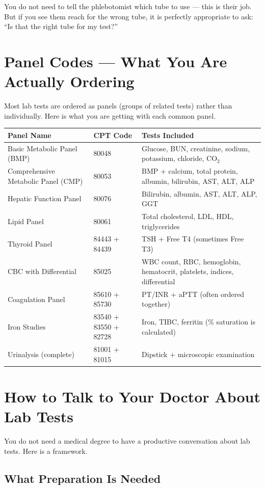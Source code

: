 You do not need to tell the phlebotomist which tube to use --- this is their job. But if you see them reach for the wrong tube, it is perfectly appropriate to ask: ``Is that the right tube for my test?''

\clearpage
\section{Panel Codes --- What You Are Actually Ordering}

Most lab tests are ordered as panels (groups of related tests) rather than individually. Here is what you are getting with each common panel.

\begin{longtable}{@{}p{4.0cm}p{3.0cm}p{6.0cm}@{}}
\toprule
\textbf{Panel Name} & \textbf{CPT Code} & \textbf{Tests Included} \\
\midrule
Basic Metabolic Panel (BMP) & 80048 & Glucose, BUN, creatinine, sodium, potassium, chloride, CO$_2$ \\
Comprehensive Metabolic Panel (CMP) & 80053 & BMP + calcium, total protein, albumin, bilirubin, AST, ALT, ALP \\
Hepatic Function Panel & 80076 & Bilirubin, albumin, AST, ALT, ALP, GGT \\
Lipid Panel & 80061 & Total cholesterol, LDL, HDL, triglycerides \\
Thyroid Panel & 84443 + 84439 & TSH + Free T4 (sometimes Free T3) \\
CBC with Differential & 85025 & WBC count, RBC, hemoglobin, hematocrit, platelets, indices, differential \\
Coagulation Panel & 85610 + 85730 & PT/INR + aPTT (often ordered together) \\
Iron Studies & 83540 + 83550 + 82728 & Iron, TIBC, ferritin (\% saturation is calculated) \\
Urinalysis (complete) & 81001 + 81015 & Dipstick + microscopic examination \\
\bottomrule
\end{longtable}

\clearpage
\section{How to Talk to Your Doctor About Lab Tests}

You do not need a medical degree to have a productive conversation about lab tests. Here is a framework.

\subsection{What Preparation Is Needed}

